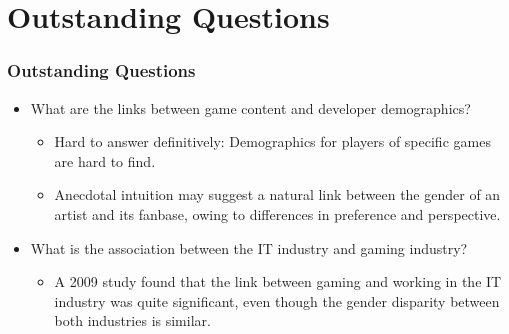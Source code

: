 \documentclass{beamer}
\begin{document}
\section{Outstanding Questions}
\begin{frame}
    \frametitle{Outstanding Questions}
    \begin{itemize}
	    \item What are the links between game content and developer demographics?
	    \begin{itemize}
	        \item Hard to answer definitively: Demographics for players of specific games are hard to find.
	        \item Anecdotal intuition may suggest a natural link between the gender of an artist and its fanbase, owing to differences in preference and perspective.
	    \end{itemize}
	    \item What is the association between the IT industry and gaming industry?
	    \begin{itemize}
	        \item A 2009 study \cite{betsy_questioning_2009} found that the link between gaming and working in the IT industry was quite significant, even though the gender disparity between both industries is similar.
        \end{itemize}
    \end{itemize}
\end{frame}

\nocite{*}
%
%
\end{document}
